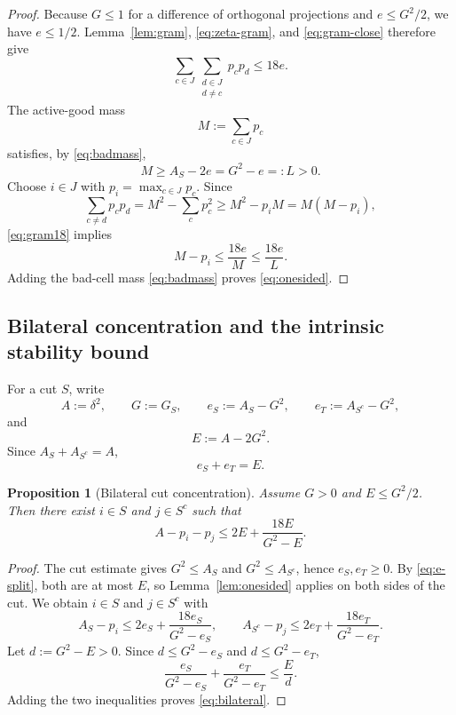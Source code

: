 \documentclass[11pt]{article}
\newtheorem{proposition}[theorem]{Proposition}
\newcommand{\dd}{\delta}
\begin{document}
\begin{proof}
Because $G\le1$ for a difference of orthogonal projections and
$e\le G^2/2$, we have $e\le1/2$.  Lemma~\ref{lem:gram},
\eqref{eq:zeta-gram}, and \eqref{eq:gram-close} therefore give
\begin{equation}\label{eq:gram18}
  \sum_{c\in J}\sum_{\substack{d\in J\\d\ne c}}p_cp_d
  \le18e.
\end{equation}
The active-good mass
\[
  M:=\sum_{c\in J}p_c
\]
satisfies, by \eqref{eq:badmass},
\[
  M\ge A_S-2e=G^2-e=:L>0.
\]
Choose $i\in J$ with $p_i=\max_{c\in J}p_c$.  Since
\[
  \sum_{c\ne d}p_cp_d
  =
  M^2-\sum_cp_c^2
  \ge M^2-p_iM
  =
  M(M-p_i),
\]
\eqref{eq:gram18} implies
\[
  M-p_i\le\frac{18e}{M}\le\frac{18e}{L}.
\]
Adding the bad-cell mass \eqref{eq:badmass} proves
\eqref{eq:onesided}.
\end{proof}

\subsection{Bilateral concentration and the intrinsic stability bound}

For a cut $S$, write
\[
  A:=\dd^2,\qquad G:=G_S,\qquad
  e_S:=A_S-G^2,\qquad
  e_T:=A_{S^c}-G^2,
\]
and
\[
  E:=A-2G^2.
\]
Since $A_S+A_{S^c}=A$,
\begin{equation}\label{eq:e-split}
  e_S+e_T=E.
\end{equation}

\begin{proposition}[Bilateral cut concentration]\label{prop:bilateral}
Assume $G>0$ and $E\le G^2/2$.  Then there exist
$i\in S$ and $j\in S^c$ such that
\begin{equation}\label{eq:bilateral}
  A-p_i-p_j
  \le
  2E+\frac{18E}{G^2-E}.
\end{equation}
\end{proposition}

\begin{proof}
The cut estimate gives $G^2\le A_S$ and $G^2\le A_{S^c}$, hence
$e_S,e_T\ge0$.  By \eqref{eq:e-split}, both are at most $E$, so
Lemma~\ref{lem:onesided} applies on both sides of the cut.  We obtain
$i\in S$ and $j\in S^c$ with
\[
  A_S-p_i
  \le
  2e_S+\frac{18e_S}{G^2-e_S},
  \qquad
  A_{S^c}-p_j
  \le
  2e_T+\frac{18e_T}{G^2-e_T}.
\]
Let $d:=G^2-E>0$.  Since
$d\le G^2-e_S$ and $d\le G^2-e_T$,
\[
  \frac{e_S}{G^2-e_S}
  +
  \frac{e_T}{G^2-e_T}
  \le
  \frac{E}{d}.
\]
Adding the two inequalities proves \eqref{eq:bilateral}.
\end{proof}
\end{document}
